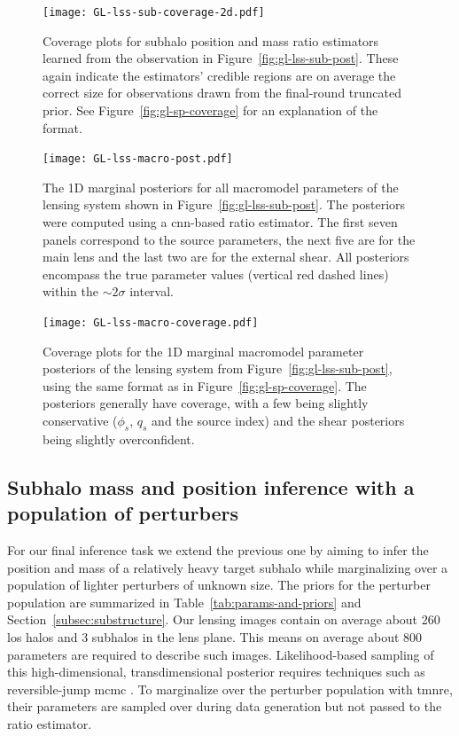 \begin{figure}
    \centering
    \texttt{[image: GL-lss-sub-coverage-2d.pdf]}
    \caption{Coverage plots for subhalo position and mass ratio estimators learned from the observation in Figure~\ref{fig:gl-lss-sub-post}. These again indicate the estimators' credible regions are on average the correct size for observations drawn from the final-round truncated prior. See Figure~\ref{fig:gl-sp-coverage} for an explanation of the format.}
    \label{fig:gl-lss-sub-coverage}
\end{figure}

\begin{figure}
    \centering
    \texttt{[image: GL-lss-macro-post.pdf]}
    \caption{The 1D marginal posteriors for all macromodel parameters of the lensing system shown in Figure~\ref{fig:gl-lss-sub-post}. The posteriors were computed using a \gls*{cnn}-based ratio estimator. The first seven panels correspond to the source parameters, the next five are for the main lens and the last two are for the external shear. All posteriors encompass the true parameter values (vertical red dashed lines) within the $\sim 2\sigma$ interval.}
    \label{fig:gl-lss-macro-post}
\end{figure}

\begin{figure}
    \centering
    \texttt{[image: GL-lss-macro-coverage.pdf]}
    \caption{Coverage plots for the 1D marginal macromodel parameter posteriors of the lensing system from Figure~\ref{fig:gl-lss-sub-post}, using the same format as in Figure~\ref{fig:gl-sp-coverage}. The posteriors generally have coverage, with a few being slightly conservative ($\phi_s$, $q_s$ and the source index) and the shear posteriors being slightly overconfident.}
    \label{fig:gl-lss-macro-coverage}
\end{figure}

\subsection{Subhalo mass and position inference with a population of perturbers}
\label{sec:lshs}

For our final inference task we extend the previous one by aiming to infer the position and mass of a relatively heavy target subhalo while marginalizing over a population of lighter perturbers of unknown size. The priors for the perturber population are summarized in Table~\ref{tab:params-and-priors} and Section~\ref{subsec:substructure}. Our lensing images contain on average about \num{260} \gls*{los} halos and \num{3} subhalos in the lens plane. This means on average about \num{800} parameters are required to describe such images. Likelihood-based sampling of this high-dimensional, transdimensional posterior requires techniques such as reversible-jump \gls*{mcmc} \citep{Daylan:2017kfh,Brewer:2015yya}. To marginalize over the perturber population with \gls*{tmnre}, their parameters are sampled over during data generation but not passed to the ratio estimator.

